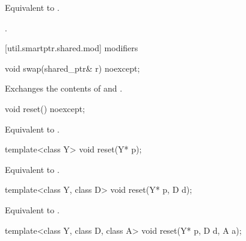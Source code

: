 \begin{itemdescr}
\pnum
\effects Equivalent to .

\pnum
\returns {}.
\end{itemdescr}



[util.smartptr.shared.mod]{ modifiers}

%
%
\begin{itemdecl}
void swap(shared_ptr& r) noexcept;
\end{itemdecl}

\begin{itemdescr}

\pnum\effects  Exchanges the contents of  and .
\end{itemdescr}

%
%
\begin{itemdecl}
void reset() noexcept;
\end{itemdecl}

\begin{itemdescr}
\pnum\effects  Equivalent to .
\end{itemdescr}

%
%
\begin{itemdecl}
template<class Y> void reset(Y* p);
\end{itemdecl}

\begin{itemdescr}
\pnum\effects  Equivalent to .
\end{itemdescr}

%
%
\begin{itemdecl}
template<class Y, class D> void reset(Y* p, D d);
\end{itemdecl}

\begin{itemdescr}
\pnum\effects  Equivalent to .
\end{itemdescr}

%
%
\begin{itemdecl}
template<class Y, class D, class A> void reset(Y* p, D d, A a);
\end{itemdecl}


